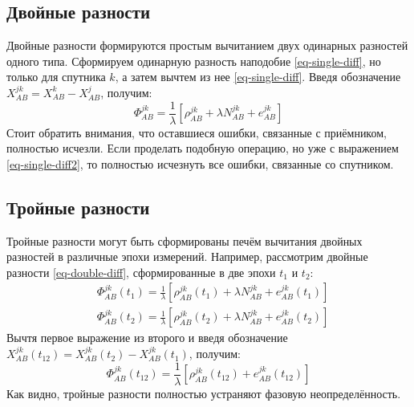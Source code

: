 \subsection*{\textbf{Двойные разности}}

Двойные разности формируются простым вычитанием двух одинарных разностей одного типа.
Сформируем одинарную разность наподобие \eqref{eq-single-diff}, но только для спутника $k$, а затем вычтем из нее \eqref{eq-single-diff}.
Введя обозначение $X_{AB}^{jk}=X_{AB}^k-X_{AB}^j$, получим:
\begin{equation}
\label{eq-double-diff}
\Phi_{AB}^{jk}=\frac{1}{\lambda}\left[\rho_{AB}^{jk}+\lambda N_{AB}^{jk}+e_{AB}^{jk}\right]    
\end{equation}
Стоит обратить внимания, что оставшиеся ошибки, связанные с приёмником, полностью исчезли.
Если проделать подобную операцию, но уже с выражением \eqref{eq-single-diff2}, то полностью исчезнуть все ошибки, связанные со спутником.

\subsection*{\textbf{Тройные разности}}

Тройные разности могут быть сформированы печём вычитания двойных разностей в различные эпохи измерений.
Например, рассмотрим двойные разности \eqref{eq-double-diff}, сформированные в две эпохи $t_1$ и $t_2$:
\begin{equation}
\begin{aligned}
&\Phi_{AB}^{jk}(t_1)=\frac{1}{\lambda}\left[\rho_{AB}^{jk}(t_1)+\lambda N_{AB}^{jk}+e_{AB}^{jk}(t_1)\right] \\
&\Phi_{AB}^{jk}(t_2)=\frac{1}{\lambda}\left[\rho_{AB}^{jk}(t_2)+\lambda N_{AB}^{jk}+e_{AB}^{jk}(t_2)\right] 
\end{aligned}
\end{equation}
Вычтя первое выражение из второго и введя обозначение $X_{AB}^{jk}(t_{12})=X_{AB}^{jk}(t_2)-X_{AB}^{jk}(t_1)$, получим:
\begin{equation}
\Phi_{AB}^{jk}(t_{12})=\frac{1}{\lambda}\left[\rho_{AB}^{jk}(t_{12})+e_{AB}^{jk}(t_{12})\right]    
\end{equation}
Как видно, тройные разности полностью устраняют фазовую неопределённость.